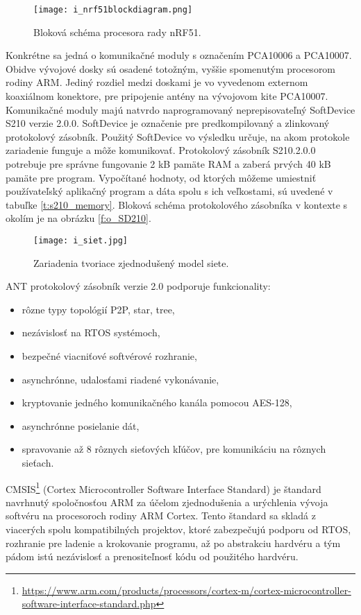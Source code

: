 \documentclass[12pt,a4wide,oneside,openright]{report}
\begin{document}
\begin{figure*}[h]
	\centering
	\texttt{[image: i\_nrf51blockdiagram.png]}
	\caption{Bloková schéma procesora rady nRF51\cite{nRF51}.}
	\label{f:o_i_nrf51blockdiagram}
\end{figure*}

Konkrétne sa jedná o komunikačné moduly s označením PCA10006 a PCA10007. Obidve vývojové dosky sú osadené totožným, vyššie spomenutým procesorom rodiny ARM. Jediný rozdiel medzi doskami je vo vyvedenom externom koaxiálnom konektore, pre pripojenie antény na vývojovom kite PCA10007.
Komunikačné moduly majú natvrdo naprogramovaný neprepisovateľný SoftDevice S210 verzie 2.0.0. SoftDevice je označenie pre predkompilovaný a zlinkovaný protokolový zásobník. Použitý SoftDevice vo výsledku určuje, na akom protokole zariadenie funguje a môže komunikovať. Protokolový zásobník S210.2.0.0 potrebuje pre správne fungovanie 2 kB pamäte RAM a zaberá prvých 40 kB pamäte pre program. Vypočítané hodnoty, od ktorých môžeme umiestniť používateľský aplikačný program a dáta spolu s ich veľkostami, sú uvedené v tabuľke \ref{t:s210_memory}. Bloková schéma protokolového zásobníka v kontexte s okolím je na obrázku \ref{f:o_SD210}.

\begin{figure*}[h]
	\centering
	\texttt{[image: i\_siet.jpg]}
	\caption{Zariadenia tvoriace zjednodušený model siete.}
	\label{f:i_devices}
\end{figure*}

ANT protokolový zásobník verzie 2.0 podporuje funkcionality\cite{SD210}:
\begin{itemize}
	\item rôzne typy topológií P2P, star, tree,
	\item nezávislosť na RTOS systémoch,
	\item bezpečné viacniťové softvérové rozhranie,
	\item asynchrónne, udalosťami riadené vykonávanie,
	\item kryptovanie jedného komunikačného kanála pomocou AES-128,
	\item asynchrónne posielanie dát,
	\item spravovanie až 8 rôznych sieťových kľúčov, pre komunikáciu na rôznych sieťach.
\end{itemize}
\onehalfspacing

CMSIS\footnote{\url{https://www.arm.com/products/processors/cortex-m/cortex-microcontroller-software-interface-standard.php}} (Cortex Microcontroller Software Interface Standard) je štandard navrhnutý spoločnosťou ARM za účelom zjednodušenia a urýchlenia vývoja softvéru na procesoroch rodiny ARM Cortex. Tento štandard sa skladá z viacerých spolu kompatibilných projektov, ktoré zabezpečujú podporu od RTOS, rozhranie pre ladenie a krokovanie programu, až po abstrakciu hardvéru a tým pádom istú nezávislosť a prenositeľnosť kódu od použitého hardvéru\cite{CMSIS}.
\end{document}
